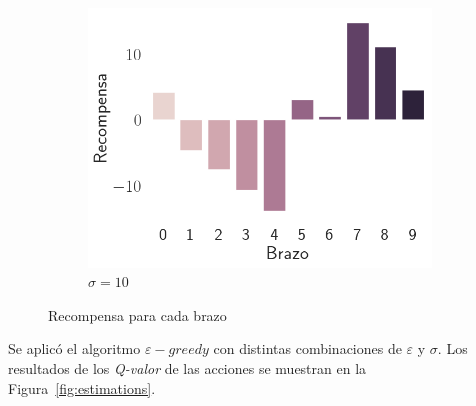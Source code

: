 \documentclass[12pt]{article}
\begin{document}
\begin{figure}[H]
\begin{subfigure}[H]{0.3\textwidth}
            \includegraphics[width=\textwidth]{../img/rewards_sigma_10}
            \caption{$\sigma=10$}
            \label{fig:rewards_10}
        \end{subfigure}
        \caption{Recompensa para cada brazo}
        \label{fig:rewards}
    \end{figure}

    Se aplicó el algoritmo $\varepsilon-greedy$ con distintas combinaciones de $\varepsilon$ y $\sigma$.
    Los resultados de los \textit{Q-valor} de las acciones se muestran en la Figura~\ref{fig:estimations}.
\end{document}

